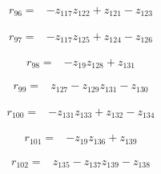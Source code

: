 \par\noindent\begin{minipage}{\linewidth}
\begin{align*}
r_{96}={}&-z_{117}z_{122}+z_{121}-z_{123}
\end{align*}
\end{minipage}\par
\par\noindent\begin{minipage}{\linewidth}
\begin{align*}
r_{97}={}&-z_{117}z_{125}+z_{124}-z_{126}
\end{align*}
\end{minipage}\par
\par\noindent\begin{minipage}{\linewidth}
\begin{align*}
r_{98}={}&-z_{19}z_{128}+z_{131}
\end{align*}
\end{minipage}\par
\par\noindent\begin{minipage}{\linewidth}
\begin{align*}
r_{99}={}&z_{127}-z_{129}z_{131}-z_{130}
\end{align*}
\end{minipage}\par
\par\noindent\begin{minipage}{\linewidth}
\begin{align*}
r_{100}={}&-z_{131}z_{133}+z_{132}-z_{134}
\end{align*}
\end{minipage}\par
\par\noindent\begin{minipage}{\linewidth}
\begin{align*}
r_{101}={}&-z_{19}z_{136}+z_{139}
\end{align*}
\end{minipage}\par
\par\noindent\begin{minipage}{\linewidth}
\begin{align*}
r_{102}={}&z_{135}-z_{137}z_{139}-z_{138}
\end{align*}
\end{minipage}\par
